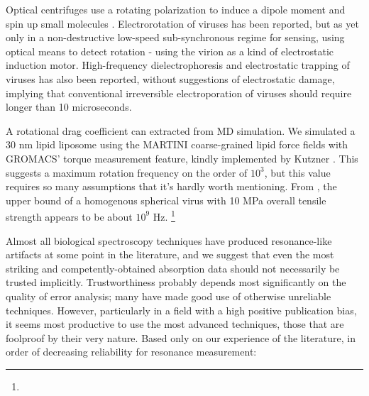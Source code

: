 \documentclass[paper.tex]{subfiles}
\begin{document}
\begin{multicols}{1}
Optical centrifuges use a rotating polarization to induce a dipole moment and spin up small molecules \cite{Forced2000}\cite{Spinning2000}. Electrorotation\cite{RotatingFieldInduced1982}\cite{Electrorotation1988}\cite{Electrorotation1997}\cite{Dielectric1988} of viruses has been reported\cite{Analysis2004}\cite{New1999}\cite{comprehensive2001}, but as yet only in a non-destructive low-speed sub-synchronous regime for sensing, using optical means to detect rotation - using the virion as a kind of electrostatic induction motor. High-frequency dielectrophoresis and electrostatic trapping of viruses has also been reported\cite{Accumulation2006}, without suggestions of electrostatic damage, implying that conventional irreversible electroporation of viruses should require longer than 10 microseconds.

A rotational drag coefficient can extracted from MD simulation\cite{Evaluating2017}. We simulated a 30 nm lipid liposome using the MARTINI coarse-grained \cite{MARTINI2007}\cite{BUMPy2018}\cite{Tsjerk2020} lipid force fields with GROMACS\cite{GROMACS2005}' torque measurement feature, kindly implemented by Kutzner \cite{Keep2011}. This suggests a maximum rotation frequency on the order of $10^3$, but this value requires so many assumptions that it's hardly worth mentioning. From \cite{Spinning2008}, the upper bound of a homogenous spherical virus with 10 MPa overall tensile strength appears to be about $10^9$ Hz. \footnote{} 



Almost all biological spectroscopy techniques have produced resonance-like artifacts at some point in the literature, and we suggest that even the most striking and competently-obtained absorption data should not necessarily be trusted implicitly. Trustworthiness probably depends most significantly on the quality of error analysis; many have made good use of otherwise unreliable techniques. However, particularly in a field with a high positive publication bias, it seems most productive to use the most advanced techniques, those that are foolproof by their very nature. Based only on our experience of the literature, in order of decreasing reliability for resonance measurement:


\end{multicols}
\end{document}
